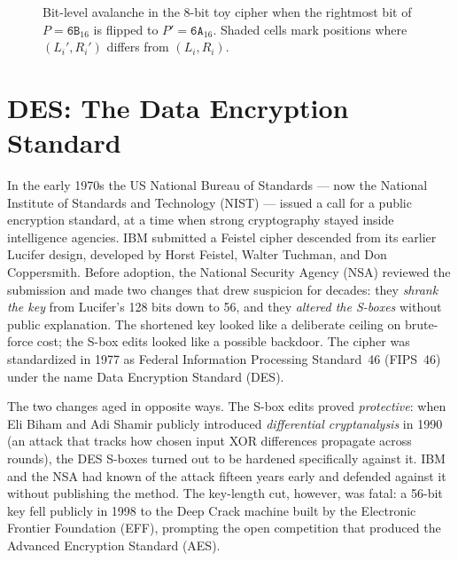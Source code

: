 \begin{figure}[htbp]
\caption{Bit-level avalanche in the 8-bit toy cipher when the rightmost bit of $P = \texttt{6B}_{16}$ is flipped to $P' = \texttt{6A}_{16}$. Shaded cells mark positions where $(L_i', R_i')$ differs from $(L_i, R_i)$.}
\label{ch11:fig-avalanche-bits}
\end{figure}

\section{DES: The Data Encryption Standard}
\label{ch11:des}

\begin{historybox}
In the early 1970s the US National Bureau of Standards --- now the National Institute of Standards and Technology (NIST) --- issued a call for a public encryption standard, at a time when strong cryptography stayed inside intelligence agencies. IBM submitted a Feistel cipher descended from its earlier Lucifer design, developed by Horst Feistel, Walter Tuchman, and Don Coppersmith. Before adoption, the National Security Agency (NSA) reviewed the submission and made two changes that drew suspicion for decades: they \emph{shrank the key} from Lucifer's 128 bits down to 56, and they \emph{altered the S-boxes} without public explanation. The shortened key looked like a deliberate ceiling on brute-force cost; the S-box edits looked like a possible backdoor. The cipher was standardized in 1977 as Federal Information Processing Standard~46 (FIPS~46) under the name Data Encryption Standard (DES).

The two changes aged in opposite ways. The S-box edits proved \emph{protective}: when Eli Biham and Adi Shamir publicly introduced \emph{differential cryptanalysis} in 1990 (an attack that tracks how chosen input XOR differences propagate across rounds), the DES S-boxes turned out to be hardened specifically against it. IBM and the NSA had known of the attack fifteen years early and defended against it without publishing the method. The key-length cut, however, was fatal: a 56-bit key fell publicly in 1998 to the Deep Crack machine built by the Electronic Frontier Foundation (EFF), prompting the open competition that produced the Advanced Encryption Standard (AES).
\end{historybox}

